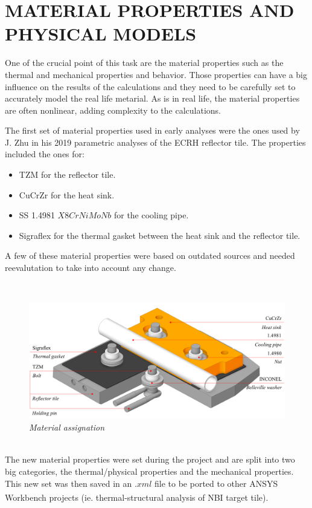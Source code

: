 \section{MATERIAL PROPERTIES AND PHYSICAL MODELS}
\normalsize{One of the crucial point of this task are the material properties such as the thermal and mechanical properties and behavior. Those properties can have a big influence on the results of the calculations and they need to be carefully set to accurately model the real life metarial. As is in real life, the material properties are often nonlinear, adding complexity to the calculations.}
\\
\break
\normalsize{\indent The first set of material properties used in early analyses were the ones used by J. Zhu in his 2019 parametric analyses \cites{zhu_parametric_2019} of the \acrshort{ECRH} reflector tile. The properties included the ones for: 
\begin{itemize}
    \item \acrlong{TZM} for the reflector tile.
    \item \acrlong{CuCrZr} for the heat sink.
    \item \acrlong{SS} 1.4981 $X8CrNiMoNb$ for the cooling pipe.
    \item \acrlong{Sigraflex} for the thermal gasket between the heat sink and the reflector tile.
  \end{itemize}
A few of these material properties were based on outdated sources and needed reevalutation to take into account any change.}
\\
\break
\begin{figure}[h!]
    \label{fig_4_1_0} 
    \centering
    \includegraphics[width=1\textwidth]{figures/materialsforpartsII.png}
    \caption{\it Material assignation}
\end{figure}
\\
\break
\normalsize{\indent The new material properties were set during the project and are split into two big categories, the thermal/physical properties and the mechanical properties. This new set was then saved in an $.xml$ file to be ported to other ANSYS Workbench\textsuperscript{\textregistered} projects (ie. thermal-structural analysis of \acrlong{NBI} target tile).}

